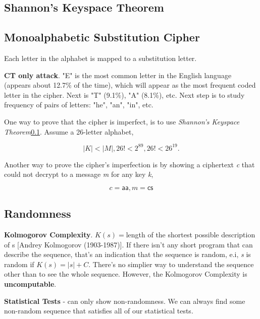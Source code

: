 \documentclass[12pt]{article}
\begin{document}
\subsection{Shannon's Keyspace Theorem}
\label{sec:shannon's_keyspace_theorem}

\subsection{Monoalphabetic Substitution Cipher}

Each letter in the alphabet is mapped to a substitution letter.

\textbf{CT only attack}. "E" is the most common letter in the English language (appears about 12.7\% of the time), which will appear as the most frequent coded letter in the cipher. Next is "T" (9.1\%), "A" (8.1\%), etc. Next step is to study frequency of pairs of letters: "he", "an", "in", etc.

One way to prove that the cipher is imperfect, is to use \emph{Shannon's Keyspace Theorem}\ref{sec:shannon's_keyspace_theorem}. Assume a 26-letter alphabet,

\begin{equation}
|K| < |M|, 26! < 2^{89}, 26! < 26^{19}.
\end{equation}

Another way to prove the cipher's imperfection is by showing a ciphertext \emph{c} that could not decrypt to a message \emph{m} for any key \emph{k},

\begin{equation}
c = \mathsf{aa}, m = \mathsf{cs}
\end{equation}

\subsection{Randomness}
\textbf{Kolmogorov Complexity}.
$K(s) = $length of the shortest possible description of s [Andrey Kolmogorov (1903-1987)]. If there isn't any short program that can describe the sequence, that's an indication that the sequence is random, e.i, \emph{s} is random if $K(s) = |s| + C$. There's no simplier way to understand the sequence other than to see the whole sequence. However, the Kolmogorov Complexity is \textbf{uncomputable}.

\textbf{Statistical Tests} - can only show non-randomness. We can always find some non-random sequence that satisfies all of our statistical tests.
\end{document}
